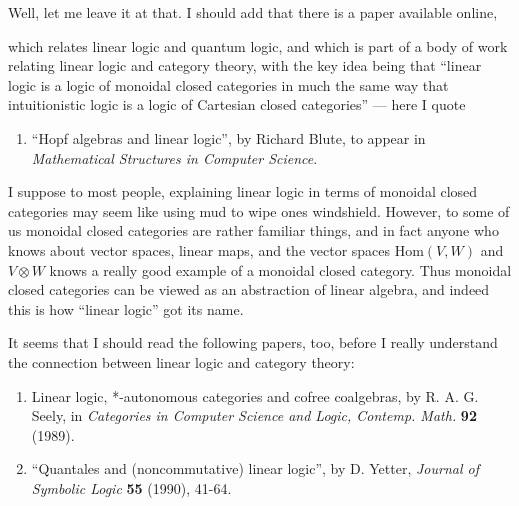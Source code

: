 \documentclass{article}
\def\tightlist{}
\renewcommand{\texttt}[1]{%
  \begingroup
  \ttfamily
  \begingroup\lccode`~=`/\lowercase{\endgroup\def~}{/\discretionary{}{}{}}%
  \begingroup\lccode`~=`[\lowercase{\endgroup\def~}{[\discretionary{}{}{}}%
  \begingroup\lccode`~=`.\lowercase{\endgroup\def~}{.\discretionary{}{}{}}%
  \catcode`/=\active\catcode`[=\active\catcode`.=\active
  \scantokens{#1\noexpand}%
  \endgroup
}
\begin{document}
Well, let me leave it at that. I should add that there is a paper
available online,


which relates linear logic and quantum logic, and which is part of a
body of work relating linear logic and category theory, with the key
idea being that ``linear logic is a logic of monoidal closed categories
in much the same way that intuitionistic logic is a logic of Cartesian
closed categories'' --- here I quote

\begin{enumerate}
\def\labelenumi{\arabic{enumi})}
\setcounter{enumi}{2}
\tightlist
\item
  ``Hopf algebras and linear logic'', by Richard Blute, to appear in
  \emph{Mathematical Structures in Computer Science}.
\end{enumerate}

I suppose to most people, explaining linear logic in terms of monoidal
closed categories may seem like using mud to wipe ones windshield.
However, to some of us monoidal closed categories are rather familiar
things, and in fact anyone who knows about vector spaces, linear maps,
and the vector spaces \(\mathrm{Hom}(V,W)\) and \(V\otimes W\) knows a
really good example of a monoidal closed category. Thus monoidal closed
categories can be viewed as an abstraction of linear algebra, and indeed
this is how ``linear logic'' got its name.

It seems that I should read the following papers, too, before I really
understand the connection between linear logic and category theory:

\begin{enumerate}
\def\labelenumi{\arabic{enumi})}
\setcounter{enumi}{3}
\item
  Linear logic, *-autonomous categories and cofree coalgebras, by R. A.
  G. Seely, in \emph{Categories in Computer Science and Logic, Contemp.
  Math.} \textbf{92} (1989).
\item
  ``Quantales and (noncommutative) linear logic'', by D. Yetter,
  \emph{Journal of Symbolic Logic} \textbf{55} (1990), 41-64.
\end{enumerate}
\end{document}
